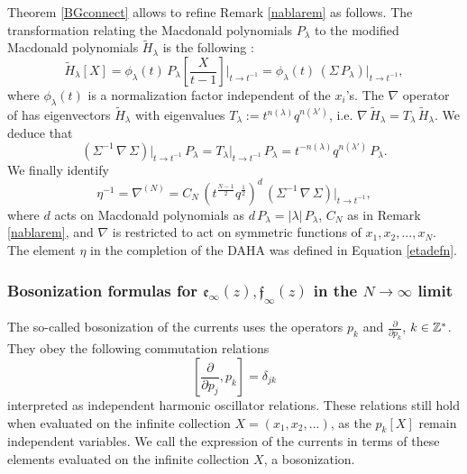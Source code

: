 \begin{remark}\label{betternablarem}
Theorem \ref{BGconnect} allows to refine Remark \ref{nablarem} as follows.
The transformation relating the Macdonald polynomials $P_\lambda$ to the modified Macdonald polynomials
${\widetilde H}_\lambda$ is the following \cite{macdo}:
$${\widetilde H}_\lambda[X]=\phi_\lambda(t) \, P_\lambda\left[ \frac{X}{t-1}\right]\Big\vert_{t\to t^{-1}}
=\phi_\lambda(t) \, (\Sigma \, P_\lambda)\vert_{t\to t^{-1}}, $$
where $\phi_\lambda(t)$ is a normalization factor independent of the $x_i$'s.
The $\nabla$ operator of \cite{BG} has eigenvectors ${\widetilde H}_\lambda$
with eigenvalues $T_\lambda:=t^{n(\lambda)}q^{n(\lambda')}$,
i.e.  $\nabla\, {\widetilde H}_\lambda=T_\lambda \, {\widetilde H}_\lambda$. We deduce that
$$(\Sigma^{-1}\, \nabla\, \Sigma)\vert_{t\to t^{-1}} \, P_\lambda= T_{\lambda}\vert_{t\to t^{-1}}\, P_\lambda
=t^{-n(\lambda)}q^{n(\lambda')}\, P_\lambda. $$
We finally identify
\begin{equation}\label{nabnab}
\eta^{-1}=\nabla^{(N)}=C_N\, (t^{\frac{N-1}{2}}q^{\frac{1}{2}})^{d}\, (\Sigma^{-1}\, \nabla\, \Sigma)\vert_{t\to t^{-1}},
\end{equation}
where $d$ acts on Macdonald polynomials as $d\, P_\lambda =|\lambda| \, P_\lambda$, $C_N$ as in Remark \ref{nablarem},
and $\nabla$ is restricted to act on symmetric functions of $x_1,x_2,...,x_N$. The element $\eta$ in the completion of the DAHA was defined in Equation \eqref{etadefn}.
\end{remark}

\subsubsection{Bosonization formulas for ${\mathfrak e}_\infty(z),{\mathfrak f}_\infty(z)$
in the $N\to\infty$ limit}

The so-called bosonization of the currents uses the operators $p_k$ and $\frac{\partial}{\partial p_k}$, $k\in {\mathbb Z}^*$. 
They obey the following commutation relations
$$
\left[ \frac{\partial}{\partial p_j}, p_k\right] = \delta_{jk}
$$
interpreted as independent harmonic oscillator relations. These relations still hold when evaluated on the infinite collection $X=(x_1,x_2,...)$, as the $p_k[X]$ remain independent variables.
We call the expression of the currents in terms of these elements evaluated on the infinite collection $X$, a bosonization.


